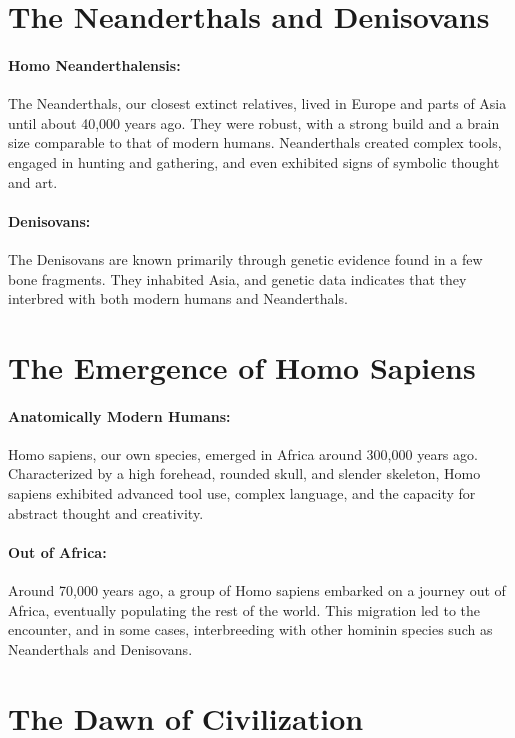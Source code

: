 \documentclass[a4paper,12pt]{book}
\begin{document}
\section*{The Neanderthals and Denisovans}

\paragraph{Homo Neanderthalensis:}
The Neanderthals, our closest extinct relatives, lived in Europe and parts of Asia until about 40,000 years ago. They were robust, with a strong build and a brain size comparable to that of modern humans. Neanderthals created complex tools, engaged in hunting and gathering, and even exhibited signs of symbolic thought and art.

\paragraph{Denisovans:}
The Denisovans are known primarily through genetic evidence found in a few bone fragments. They inhabited Asia, and genetic data indicates that they interbred with both modern humans and Neanderthals.

\section*{The Emergence of Homo Sapiens}

\paragraph{Anatomically Modern Humans:}
Homo sapiens, our own species, emerged in Africa around 300,000 years ago. Characterized by a high forehead, rounded skull, and slender skeleton, Homo sapiens exhibited advanced tool use, complex language, and the capacity for abstract thought and creativity.

\paragraph{Out of Africa:}
Around 70,000 years ago, a group of Homo sapiens embarked on a journey out of Africa, eventually populating the rest of the world. This migration led to the encounter, and in some cases, interbreeding with other hominin species such as Neanderthals and Denisovans.

\section*{The Dawn of Civilization}
\end{document}
